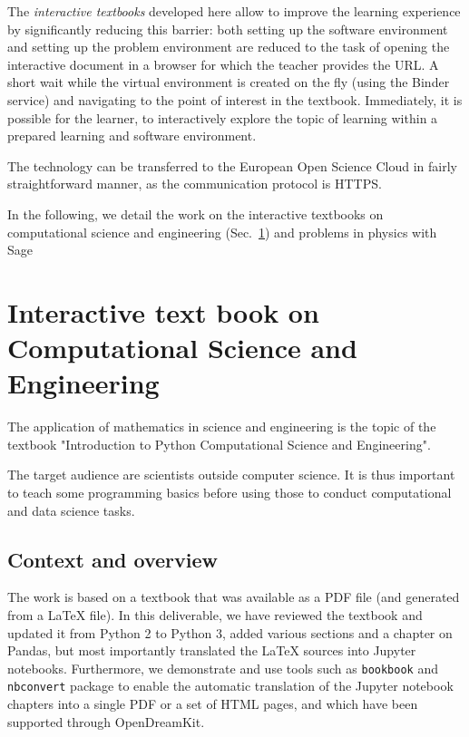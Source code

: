 \documentclass{deliverablereport}
\begin{document}
The \emph{interactive textbooks} developed here allow to improve the
learning experience by significantly reducing this barrier: both
setting up the software environment and setting up the problem
environment are reduced to the task of opening the interactive
document in a browser for which the teacher provides the URL. A short
wait while the virtual environment is created on the fly (using the
Binder service) and navigating to the point of interest in the
textbook. Immediately, it is possible for the learner, to
interactively explore the topic of learning within a prepared learning
and software environment.

The technology can be transferred to the European Open Science Cloud
in fairly straightforward manner, as the communication protocol is HTTPS.

In the following, we detail the work on the interactive textbooks on
computational science and engineering (Sec.~\ref{sec:computational-science-and-engineering})
and problems in physics with Sage 

\section{Interactive text book on Computational Science and Engineering}
\label{sec:computational-science-and-engineering}

The application of mathematics in science and engineering is the topic
of the textbook "Introduction to Python Computational Science and
Engineering".

The target audience are scientists outside computer science. It is
thus important to teach some programming basics before using those to
conduct computational and data science tasks.

\subsection{Context and overview}

The work is based on a textbook that was available as a PDF file (and
generated from a \LaTeX{} file). In this deliverable, we have reviewed
the textbook and updated it from Python 2 to Python 3, added various
sections and a chapter on Pandas, but most importantly translated the
\LaTeX{} sources into Jupyter notebooks. Furthermore, we demonstrate
and use tools such as \texttt{bookbook} and \texttt{nbconvert} package
to enable the automatic translation of the Jupyter notebook chapters
into a single PDF or a set of HTML pages, and which have been
supported through OpenDreamKit.
\end{document}
